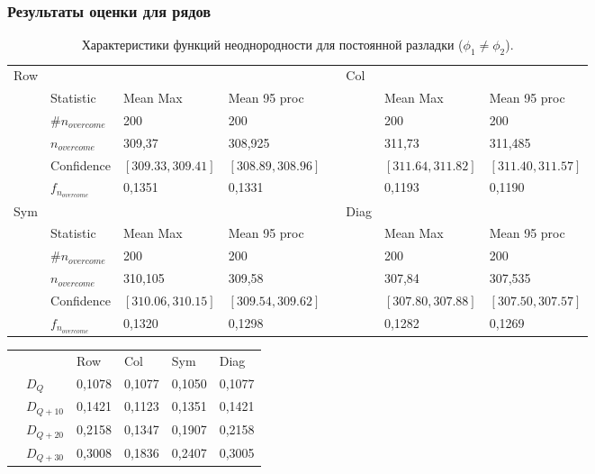 \documentclass[11pt]{beamer}
\begin{document}
	\begin{frame}
		\frametitle{Результаты оценки для рядов}
		\tiny
		\begin{table}[!hhh]
			\caption{Характеристики функций неоднородности для постоянной разладки ($\phi_1 \neq \phi_2$).}
			\begin{tabular}{llllllll}
				Row & 				   & 		  	  & 			 && Col & 		      & 			      \\
				& Statistic        & Mean Max 	  & Mean 95 proc && 	& Mean Max     & Mean 95 proc     \\
				& $\#n_{overcome}$ & 200 	  	  & 200 		 &&     & 200 	      & 200 			  \\
				& $n_{overcome}$   & 309,37   	  & 308,925      &&     & 311,73       & 311,485 		  \\
				& Confidence       & $[309.33, 309.41]$& $[308.89, 308.96]$&&     & $[311.64, 311.82]$ & $[311.40, 311.57]$     \\
				&$f_{n_{overcome}}$& 0,1351	  &	0,1331		 &&     & 0,1193  &   0,1190         \\
				Sym & 				   & 		  	  & 			 && Diag& 		      & 			      \\
				& Statistic        & Mean Max 	  & Mean 95 proc && 	& Mean Max     & Mean 95 proc     \\
				& $\#n_{overcome}$ & 200 	  	  & 200 		 &&     & 200 	      & 200 			  \\
				& $n_{overcome}$   & 310,105   	  & 309,58      &&     & 307,84      & 307,535 		  \\
				& Confidence       & $[310.06, 310.15]$ & $[309.54, 309.62]$ &&     & $[307.80, 307.88]$ & $[307.50, 307.57]$     \\
				&$f_{n_{overcome}}$& 0,1320		  &	0,1298		 &&     & 0,1282		 &0,1269          \\
			\end{tabular}
		\end{table}
		\begin{table}[!hhh]
			\begin{tabular}{llllll}
				&              & Row 	  & Col 	& Sym    & Diag  \\
				& $D_Q$        & 0,1078	  & 0,1077 	& 0,1050 & 0,1077		\\
				& $D_{Q+10}$   & 0,1421   & 0,1123  & 0,1351 & 0,1421	\\
				& $D_{Q+20}$   & 0,2158   & 0,1347  & 0,1907 & 0,2158	\\
				& $D_{Q+30}$   & 0,3008	  &	0,1836	& 0,2407 & 0,3005	
			\end{tabular}
		\end{table}
	\end{frame}
\end{document}
